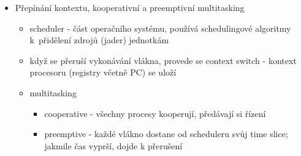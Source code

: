 \begin{itemize}
\begin{itemize}
\begin{itemize}
\item loader - vezme program a načte ho do paměti
\item někde v hlavičce programu je informace o tom, kde program (výkon instrukcí) začíná
\end{itemize}
\item proces
\begin{itemize}
\item instance programu vytvořená operačním systémem
\item je to datová struktura uvnitř operačního systému, v níž jsou uložené různá data, která daný program potřebuje
\item vlastní: kód, prostor v paměti, další prostředky
\end{itemize}
\item vlákno (thread)
\begin{itemize}
\item místo uvnitř procesu, kde se vykonávají instrukce
\item kontext procesoru - datová struktura, ve které jsou uložené registry procesoru, pokud dané vlákno zrovna neběží
\item vlastní: pozici v kódu (program counter / instruction pointer), svůj zásobník, stav procesoru
\end{itemize}
\item fiber
\begin{itemize}
\item lightweight vlákno
\item nemá celý kontext
\item scheduling se dělá kooperativně (jednotlivé fibery se vzájemně vyměňují v běhu)
\end{itemize}
\end{itemize}
\item Přepínání kontextu, kooperativní a preemptivní multitasking
\begin{itemize}
\item scheduler - část operačního systému, používá schedulingové algoritmy k~přidělení zdrojů (jader) jednotkám
\item když se přeruší vykonávání vlákna, provede se context switch - kontext procesoru (registry včetně PC) se uloží
\item multitasking
\begin{itemize}
\item cooperative - všechny procesy kooperují, předávají si řízení
\item preemptive - každé vlákno dostane od scheduleru svůj time slice; jakmile čas vyprší, dojde k přerušení

\end{itemize}
\end{itemize}
\end{itemize}
